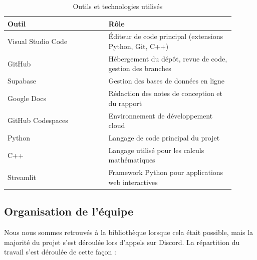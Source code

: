 \documentclass[a4paper, 12pt, twoside]{article}
\begin{document}
\begin{table}[h]
\begin{center}
\begin{tabular}{|p{0.4\linewidth}|p{0.5\linewidth}|}
\hline
\textbf{Outil} & \textbf{Rôle} \\
\hline
Visual Studio Code & Éditeur de code principal (extensions Python, Git, C++) \\
\hline
GitHub & Hébergement du dépôt, revue de code, gestion des branches \\
\hline
Supabase & Gestion des bases de données en ligne \\
\hline
Google Docs & Rédaction des notes de conception et du rapport \\
\hline
GitHub Codespaces & Environnement de développement cloud \\
\hline
Python & Langage de code principal du projet \\
\hline
C++ & Langage utilisé pour les calculs mathématiques \\
\hline
Streamlit & Framework Python pour applications web interactives \\
\hline
\end{tabular}
\end{center}
\caption{Outils et technologies utilisés}
\label{tab:outils}
\end{table}

\subsection{Organisation de l'équipe}

Nous nous sommes retrouvés à la bibliothèque lorsque cela était
possible, mais la majorité du projet s'est déroulée lors d'appels sur
Discord. La répartition du travail s'est déroulée de cette façon :
\end{document}
